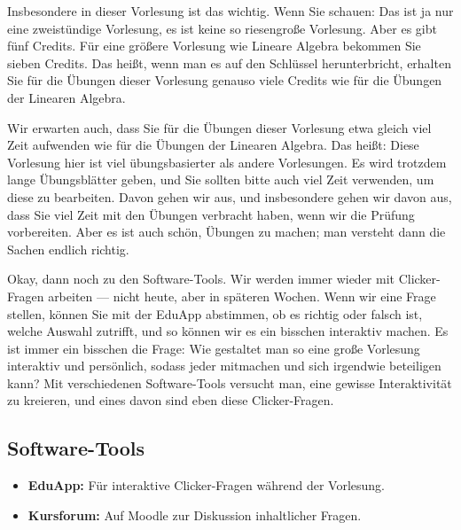 \begin{spoken-clean}[00:12:10 - 00:14:15]
Insbesondere in dieser Vorlesung ist das wichtig. Wenn Sie schauen: Das ist ja nur eine zweistündige Vorlesung, es ist keine so riesengroße Vorlesung. Aber es gibt fünf Credits. Für eine größere Vorlesung wie Lineare Algebra bekommen Sie sieben Credits. Das heißt, wenn man es auf den Schlüssel herunterbricht, erhalten Sie für die Übungen dieser Vorlesung genauso viele Credits wie für die Übungen der Linearen Algebra. 

Wir erwarten auch, dass Sie für die Übungen dieser Vorlesung etwa gleich viel Zeit aufwenden wie für die Übungen der Linearen Algebra. Das heißt: Diese Vorlesung hier ist viel übungsbasierter als andere Vorlesungen. Es wird trotzdem lange Übungsblätter geben, und Sie sollten bitte auch viel Zeit verwenden, um diese zu bearbeiten. Davon gehen wir aus, und insbesondere gehen wir davon aus, dass Sie viel Zeit mit den Übungen verbracht haben, wenn wir die Prüfung vorbereiten. Aber es ist auch schön, Übungen zu machen; man versteht dann die Sachen endlich richtig.

Okay, dann noch zu den Software-Tools. Wir werden immer wieder mit Clicker-Fragen arbeiten --- nicht heute, aber in späteren Wochen. Wenn wir eine Frage stellen, können Sie mit der EduApp abstimmen, ob es richtig oder falsch ist, welche Auswahl zutrifft, und so können wir es ein bisschen interaktiv machen. Es ist immer ein bisschen die Frage: Wie gestaltet man so eine große Vorlesung interaktiv und persönlich, sodass jeder mitmachen und sich irgendwie beteiligen kann? Mit verschiedenen Software-Tools versucht man, eine gewisse Interaktivität zu kreieren, und eines davon sind eben diese Clicker-Fragen.
\end{spoken-clean}

\subsection{Software-Tools}
\begin{math-stroke}
\begin{itemize}
    \item \textbf{EduApp:} Für interaktive Clicker-Fragen während der Vorlesung.
    \item \textbf{Kursforum:} Auf Moodle zur Diskussion inhaltlicher Fragen.
\end{itemize}
\end{math-stroke}

